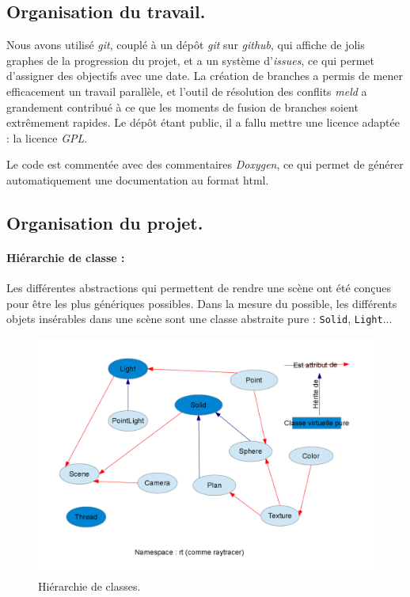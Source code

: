 \subsection{Organisation du travail.}
  Nous avons utilisé \emph{git}, couplé à un dépôt \emph{git} sur \emph{github}, qui affiche de jolis graphes de la progression du projet, 
  et a un système d'\emph{issues}, ce qui permet d'assigner des objectifs avec une date. 
   La création de branches a permis de mener efficacement un travail parallèle, et l'outil de résolution des conflits \emph{meld} a grandement contribué à ce que les moments
  de fusion de branches soient extrêmement rapides.
  Le dépôt étant public, il a fallu mettre une licence adaptée : la licence \emph{GPL}.
  
  Le code est commentée avec des commentaires \emph{Doxygen}, ce qui permet de générer automatiquement une documentation au format html.
  
\subsection{Organisation du projet.}

\paragraph{Hiérarchie de classe : } 
Les différentes abstractions qui permettent de rendre une scène ont été conçues pour être les plus génériques possibles. Dans la mesure du possible, les différents  objets insérables dans une scène sont une classe abstraite pure : \verb|Solid|, \verb|Light|...
\begin{figure}[h]
\begin{center}
\includegraphics[scale=0.35]{hierarchie.png}
\end{center}
\caption{Hiérarchie de classes.}
\end{figure}

